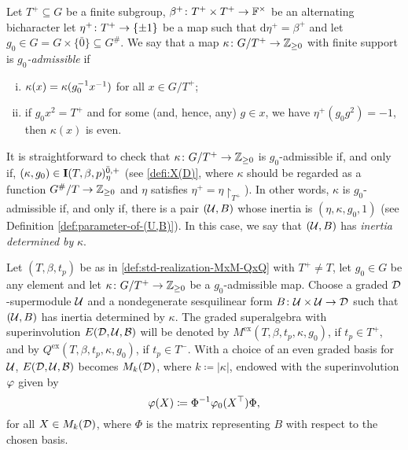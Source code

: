 
\begin{defi}\label{defi:odd-D-kappa-g_0-admissible}
    Let $T^+ \subseteq G$ be a finite subgroup, $\beta^+\colon T^+\times T^+ \to \mathbb{F}^\times$ be an alternating bicharacter let $\eta^+\colon T^+ \to \{ \pm 1 \}$ be a map such that $\mathrm{d}\eta^+ = \beta^+$ and let $g_0 \in G = G \times \{ \bar 0 \} \subseteq G^\#$. 
    We say that a map $\kappa\colon G/T^+ \to \mathbb{Z}_{\geq 0}$ with finite support is \emph{$g_0$-admissible} if
	\begin{enumerate}[(i)]
		\item $\kappa(x) = \kappa(g_0^{-1} x^{-1})$ for all $x \in G/T^+$;
		\item if $g_0 x^2 = T^+$ and 
		for some (and, hence, any) $g\in x$, we have $\eta^+(g_0g^2) = -1$, then $\kappa (x)$ is even.
	\end{enumerate}
\end{defi}

It is straightforward to check that $\kappa\colon G/T^+ \to \mathbb{Z}_{\geq 0}$ is $g_0$-admissible if, and only if, $(\kappa, g_0) \in \mathbf{I}(T,\beta,p)^{{\bar{0}}, +}_\eta$ (see \cref{defi:X(D)}, where $\kappa$ should be regarded as a function $G^\#/T \to \mathbb{Z}_{\geq 0}$ and $\eta$ satisfies $\eta^+ = \eta\restriction_{T^+}$). 
In other words, $\kappa$ is $g_0$-admissible if, and only if, there is a pair $(\mathcal U, B)$ whose inertia is $(\eta, \kappa, g_0, 1)$ (see Definition \ref{def:parameter-of-(U,B)}). 
In this case, we say that $(\mathcal U, B)$ has \emph{inertia determined by} $\kappa$. 

\begin{defi}\label{def:model-grd-MxM-odd-or-QxQ}
    Let $(T, \beta, t_p)$ be as in \cref{def:std-realization-MxM-QxQ} with $T^+ \neq T$, 
    let $g_0 \in G$ be any element and
    let $\kappa\colon G/T^+ \to \mathbb{Z}_{\geq 0}$ be a $g_0$-admissible map.
    Choose a graded $\mathcal{D}$-supermodule $\mathcal U$ and a nondegenerate sesquilinear form $B\colon \mathcal U\times \mathcal U \to \mathcal{D}$ such that $(\mathcal U, B)$ has inertia determined by $\kappa$. 
    The graded superalgebra with superinvolution $E(\mathcal{D}, \mathcal U, \mathcal B)$ will be denoted by $M^{\mathrm{ex}}(T, \beta, t_p, \kappa, g_0)$, if $t_p \in T^+$, and by $Q^{\mathrm{ex}}(T, \beta, t_p, \kappa, g_0)$, if $t_p \in T^-$. 
    With a choice of an even graded basis for $\mathcal U$, $E(\mathcal{D}, \mathcal U, \mathcal B)$ becomes $M_k (\mathcal{D})$, where $k \coloneqq |\kappa|$, endowed with the superinvolution $\varphi$ given by 
    \[
        \varphi(X) \coloneqq \Phi^{-1} \varphi_0(X^{\top}) \Phi,
    \]
    for all $X \in M_k(\mathcal{D})$, where $\Phi$ is the matrix representing $B$ with respect to the chosen basis. 
\end{defi}

